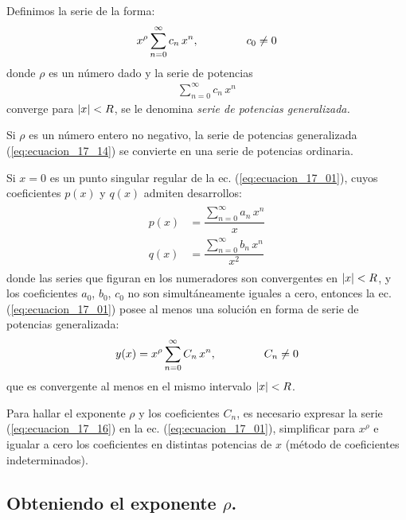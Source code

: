 Definimos la serie de la forma:
\begin{align}
x^{\rho} \sum_{n=0}^{\infty} c_{n} \, x^{n}, \hspace{1.5cm} c_{0} \neq 0
\label{eq:ecuacion_17_14}
\end{align}
donde $\rho$ es un número dado y la serie de potencias
\begin{align*}
\sum_{n=0}^{\infty} c_{n} \, x^{n}
\end{align*}
converge para $\abs{x} < R$, se le denomina \emph{serie de potencias generalizada.}
\par
Si $\rho$ es un número entero no negativo, la serie de potencias generalizada (\ref{eq:ecuacion_17_14}) se convierte en una serie de potencias ordinaria.
\begin{teo}
Si $x = 0$ es un punto singular regular de la ec. (\ref{eq:ecuacion_17_01}), cuyos coeficientes $p(x)$ y $q(x)$ admiten desarrollos:
\begin{align}
\begin{aligned}
p(x) &= \dfrac{\displaystyle \sum_{n=0}^{\infty} a_{n} \, x^{n}}{x} \\[1em]
q(x) &= \dfrac{\displaystyle \sum_{n=0}^{\infty} b_{n} \, x^{n}}{x^{2}}
\end{aligned}
\label{eq:ecuacion_17_15}
\end{align}
donde las series que figuran en los numeradores son convergentes en $\abs{x} < R$, y los coeficientes $a_{0}$, $b_{0}$, $c_{0}$ no son simultáneamente iguales a cero, entonces la ec. (\ref{eq:ecuacion_17_01}) posee al menos una solución en forma de serie de potencias generalizada:
\begin{align}
y(x) = x^{\rho} \sum_{n=0}^{\infty} C_{n} \, x^{n}, \hspace{1.5cm} C_{n} \neq 0
\label{eq:ecuacion_17_16}
\end{align}
que es convergente al menos en el mismo intervalo $\abs{x} < R$.
\end{teo}

Para hallar el exponente $\rho$ y los coeficientes $C_{n}$, es necesario expresar la serie (\ref{eq:ecuacion_17_16}) en la ec. (\ref{eq:ecuacion_17_01}), simplificar para $x^{\rho}$ e igualar a cero los coeficientes en distintas potencias de $x$ (método de coeficientes indeterminados).

\subsection{Obteniendo el exponente \texorpdfstring{$\rho$}{r}.}

